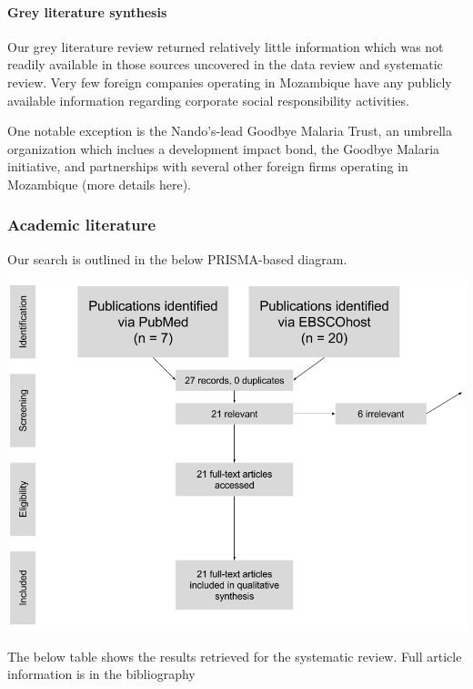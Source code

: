 \documentclass[]{elsarticle} %
\begin{document}
\paragraph{Grey literature synthesis}\label{grey-literature-synthesis}

Our grey literature review returned relatively little information which
was not readily available in those sources uncovered in the data review
and systematic review. Very few foreign companies operating in
Mozambique have any publicly available information regarding corporate
social responsibility activities.

One notable exception is the Nando's-lead Goodbye Malaria Trust, an
umbrella organization which inclues a development impact bond, the
Goodbye Malaria initiative, and partnerships with several other foreign
firms operating in Mozambique (more details here).

\subsubsection{Academic literature}\label{academic-literature-1}

Our search is outlined in the below PRISMA-based diagram.

\begin{center}
\includegraphics[width=400pt]{img/prisma.png}
\end{center}

The below table shows the results retrieved for the systematic review.
Full article information is in the bibliography

\begingroup\fontsize{6pt}{7pt}\selectfont
\end{document}
